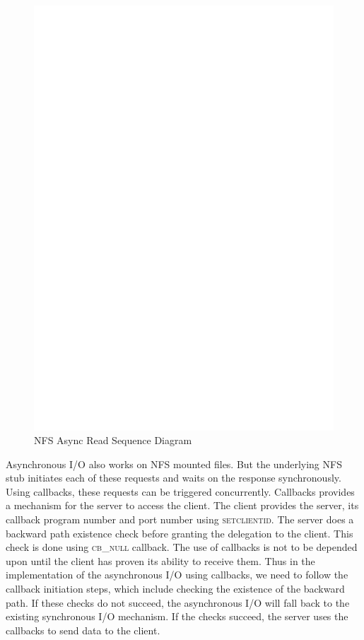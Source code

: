 \begin{figure}
\centering
\includegraphics[scale=0.75]{figures/AsyncSequence.eps}
\caption{NFS Async Read Sequence Diagram}
\label{fig:NFSAsyncRead}
\end{figure}

Asynchronous I/O also works on NFS mounted files. But the underlying NFS stub initiates each of these requests and waits on the response synchronously. Using callbacks, these requests can be triggered concurrently. Callbacks provides a mechanism for the server to access the client. The client provides the server, its callback program number and port number using \textsc{setclientid}. The server does a backward path existence check before granting the delegation to the client. This check is done using \textsc{cb\_null} callback. The use of callbacks is not to be depended upon until the client has proven its ability to receive them. Thus in the implementation of the asynchronous I/O using callbacks, we need to follow the callback initiation steps, which include checking the existence of the backward path. If these checks do not succeed, the asynchronous I/O will fall back to the existing synchronous I/O mechanism. If the checks succeed, the server uses the callbacks to send data to the client.

